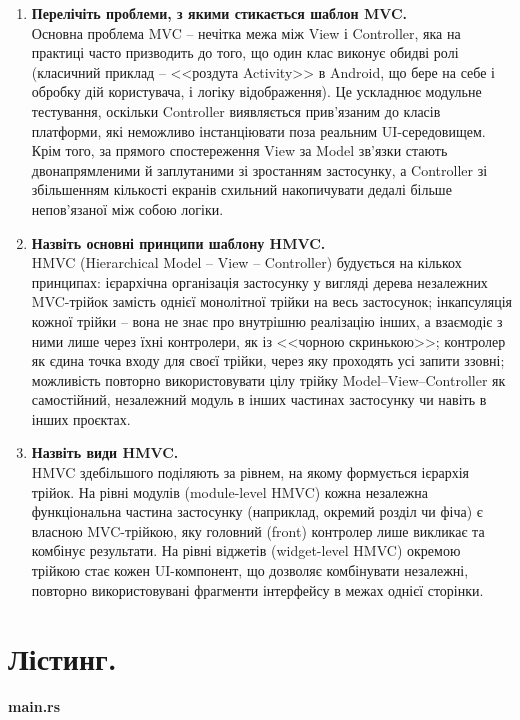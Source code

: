 \documentclass[14pt, a4paper]{extreport}
\begin{document}
\begin{enumerate}
		\item \textbf{Перелічіть проблеми, з якими стикається шаблон MVC.} \\ Основна проблема MVC -- нечітка межа між View і Controller, яка на практиці часто призводить до того, що один клас виконує обидві ролі (класичний приклад -- <<роздута Activity>> в Android, що бере на себе і обробку дій користувача, і логіку відображення). Це ускладнює модульне тестування, оскільки Controller виявляється прив'язаним до класів платформи, які неможливо інстанціювати поза реальним UI-середовищем. Крім того, за прямого спостереження View за Model зв'язки стають двонапрямленими й заплутаними зі зростанням застосунку, а Controller зі збільшенням кількості екранів схильний накопичувати дедалі більше непов'язаної між собою логіки.

		\item \textbf{Назвіть основні принципи шаблону HMVC.} \\ HMVC (Hierarchical Model -- View -- Controller) будується на кількох принципах: ієрархічна організація застосунку у вигляді дерева незалежних MVC-трійок замість однієї монолітної трійки на весь застосунок; інкапсуляція кожної трійки -- вона не знає про внутрішню реалізацію інших, а взаємодіє з ними лише через їхні контролери, як із <<чорною скринькою>>; контролер як єдина точка входу для своєї трійки, через яку проходять усі запити ззовні; можливість повторно використовувати цілу трійку Model--View--Controller як самостійний, незалежний модуль в інших частинах застосунку чи навіть в інших проєктах.

		\item \textbf{Назвіть види HMVC.} \\ HMVC здебільшого поділяють за рівнем, на якому формується ієрархія трійок. На рівні модулів (module-level HMVC) кожна незалежна функціональна частина застосунку (наприклад, окремий розділ чи фіча) є власною MVC-трійкою, яку головний (front) контролер лише викликає та комбінує результати. На рівні віджетів (widget-level HMVC) окремою трійкою стає кожен UI-компонент, що дозволяє комбінувати незалежні, повторно використовувані фрагменти інтерфейсу в межах однієї сторінки.
	\end{enumerate}

	\pagebreak

	\section*{Лістинг.}

	\textbf{main.rs}
\end{document}
